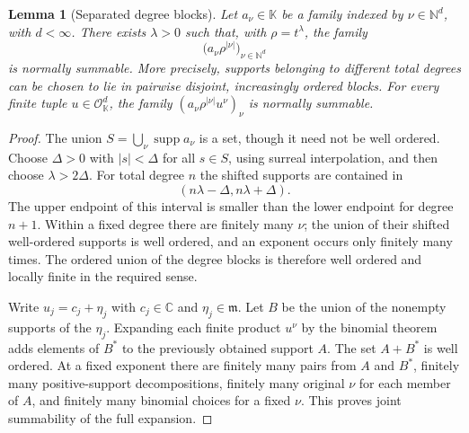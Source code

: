 \documentclass[11pt,letterpaper]{article}
\numberwithin{equation}{section}
\newtheorem{lemma}[lemma]{Lemma}
\theoremstyle{definition}
\theoremstyle{remark}
\newcommand{\K}{\mathbb K}
\newcommand{\C}{\mathbb C}
\newcommand{\N}{\mathbb N}
\newcommand{\OO}{\mathcal O}
\newcommand{\mm}{\mathfrak m}
\DeclareMathOperator{\supp}{supp}
\begin{document}
\begin{lemma}[Separated degree blocks]\label{lem:blocks}
Let $a_\nu\in\K$ be a family indexed by $\nu\in\N^d$, with $d<\infty$.
There exists $\lambda>0$ such that, with $\rho=t^\lambda$, the family
\[
 \bigl(a_\nu\rho^{|\nu|}\bigr)_{\nu\in\N^d}
\]
is normally summable. More precisely, supports belonging to different
total degrees can be chosen to lie in pairwise disjoint, increasingly
ordered blocks. For every finite tuple $u\in\OO_\K^d$, the family
$(a_\nu\rho^{|\nu|}u^\nu)_\nu$ is normally summable.
\end{lemma}
\begin{proof}
The union $S=\bigcup_\nu\supp a_\nu$ is a set, though it need not be well
ordered. Choose $\Delta>0$ with $|s|<\Delta$ for all $s\in S$, using
surreal interpolation, and then choose $\lambda>2\Delta$.
For total degree $n$ the shifted supports are contained in
\[
 (n\lambda-\Delta,n\lambda+\Delta).
\]
The upper endpoint of this interval is smaller than the lower endpoint
for degree $n+1$. Within a fixed degree there are finitely many $\nu$;
the union of their shifted well-ordered supports is well ordered, and an
exponent occurs only finitely many times. The ordered union of the degree
blocks is therefore well ordered and locally finite in the required sense.

Write $u_j=c_j+\eta_j$ with $c_j\in\C$ and $\eta_j\in\mm$. Let $B$ be
the union of the nonempty supports of the $\eta_j$. Expanding each finite
product $u^\nu$ by the binomial theorem adds elements of $B^*$ to the
previously obtained support $A$. The set $A+B^*$ is well ordered. At a
fixed exponent there are finitely many pairs from $A$ and $B^*$, finitely
many positive-support decompositions, finitely many original $\nu$ for
each member of $A$, and finitely many binomial choices for a fixed $\nu$.
This proves joint summability of the full expansion.
\end{proof}
\end{document}
